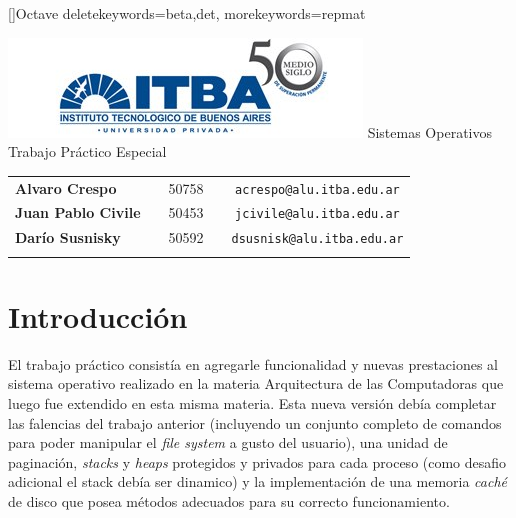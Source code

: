 \documentclass[a4paper,10pt]{article}
\begin{document}
\renewcommand{\lstlistingname}{C\'odigo Fuente}
[]{Octave}{
	deletekeywords={beta,det},
	morekeywords={repmat}
} 
\begin{titlepage}
        \thispagestyle{empty}
        \begin{center}
                \includegraphics{./images/itba.jpg}
                \vfill
                \Huge{Sistemas Operativos}\\
                \vspace{1cm}
                \huge{Trabajo Práctico Especial}\\
        \end{center}
        \vspace{2cm}
        \large{
                \begin{tabular}{lcrc}
                        \textbf{Alvaro Crespo} & & 50758 & \ \ \texttt{acrespo@alu.itba.edu.ar}\\
                        \textbf{Juan Pablo Civile} & & 50453 & \ \ \texttt{jcivile@alu.itba.edu.ar}\\
                        \textbf{Darío Susnisky} & & 50592 & \ \ \texttt{dsusnisk@alu.itba.edu.ar}\\
                        \\ 
                \end{tabular}
        }
        \vfill
\end{titlepage}

\setcounter{page}{1}

\tableofcontents
\newpage
\section{Introducción}
El trabajo práctico consistía en agregarle funcionalidad y nuevas prestaciones al sistema operativo realizado en la materia 
Arquitectura de las Computadoras que luego fue extendido en esta misma materia. Esta nueva versión debía completar las falencias 
del trabajo anterior (incluyendo un conjunto completo de comandos para poder manipular el \textit{file system} a gusto del 
usuario), una unidad de paginación, \textit{stacks} y \textit{heaps} protegidos y privados para cada proceso (como desafio adicional 
el stack debía ser dinamico) y la implementación de una memoria \textit{caché} de disco que posea métodos adecuados para su correcto 
funcionamiento.
\end{document}
